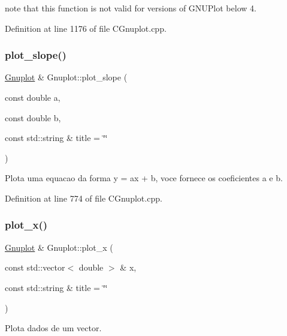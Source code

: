 \begin{DoxyItemize}
\item note that this function is not valid for versions of G\+N\+U\+Plot below 4. 
\end{DoxyItemize}

Definition at line 1176 of file C\+Gnuplot.\+cpp.

\mbox{\label{class_gnuplot_a51ea5105eb87285820bb93910f8d346c}} 
\subsubsection{\texorpdfstring{plot\+\_\+slope()}{plot\_slope()}}
{\footnotesize\ttfamily \hyperlink{class_gnuplot}{Gnuplot} \& Gnuplot\+::plot\+\_\+slope (\begin{DoxyParamCaption}\item[{const double}]{a,  }\item[{const double}]{b,  }\item[{const std\+::string \&}]{title = {\ttfamily \char`\"{}\char`\"{}} }\end{DoxyParamCaption})}



Plota uma equacao da forma y = ax + b, voce fornece os coeficientes a e b. 



Definition at line 774 of file C\+Gnuplot.\+cpp.

\mbox{\label{class_gnuplot_a9400d43204b9df62851c063aee604f0d}} 
\subsubsection{\texorpdfstring{plot\+\_\+x()}{plot\_x()}}
{\footnotesize\ttfamily \hyperlink{class_gnuplot}{Gnuplot} \& Gnuplot\+::plot\+\_\+x (\begin{DoxyParamCaption}\item[{const std\+::vector$<$ double $>$ \&}]{x,  }\item[{const std\+::string \&}]{title = {\ttfamily \char`\"{}\char`\"{}} }\end{DoxyParamCaption})}



Plota dados de um vector. 



